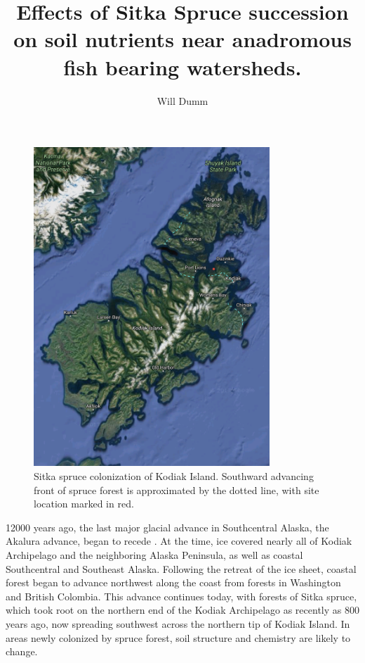 \documentclass[hidelinks, 12pt]{article}
\begin{document}
\title{\vspace{-1in}Effects of Sitka Spruce succession on soil nutrients near anadromous fish bearing watersheds.}
\author{Will Dumm}
\maketitle
\hrulefill
\vspace{.2in}

\begin{figure}
    \vspace{-10pt}
\includegraphics[width=3.5in]{Kodiak.png}
\caption{Sitka spruce colonization of Kodiak Island. Southward advancing front of spruce forest is approximated by the dotted line, with site location marked in red.}
\label{fig:Kodiak}
\vspace{-10pt}
\end{figure}

12000 years ago, the last major glacial advance in Southcentral Alaska, the Akalura advance, began to recede \cite{NelsonPollenRecord}. At the time, ice covered nearly all of Kodiak Archipelago and the neighboring Alaska Peninsula, as well as coastal Southcentral and Southeast Alaska. Following the retreat of the ice sheet, coastal forest began to advance northwest along the coast from forests in Washington and British Colombia. This advance continues today, with forests of Sitka spruce, which took root on the northern end of the Kodiak Archipelago as recently as 800 years ago, now spreading southwest across the northern tip of Kodiak Island. In areas newly colonized by spruce forest, soil structure and chemistry are likely to change.
\end{document}
